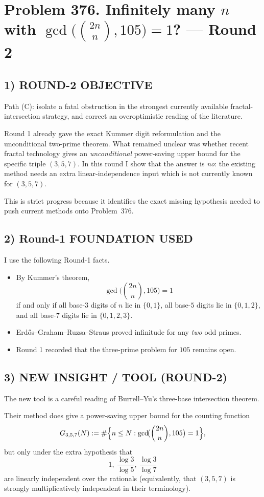 \section*{Problem 376. Infinitely many $n$ with $\gcd\!\bigl(\binom{2n}{n},105\bigr)=1$? --- Round 2}

\subsection*{1) ROUND-2 OBJECTIVE}
Path (C): isolate a fatal obstruction in the strongest currently available fractal-intersection strategy, and correct an overoptimistic reading of the literature.

Round 1 already gave the exact Kummer digit reformulation and the unconditional two-prime theorem.
What remained unclear was whether recent fractal technology gives an \emph{unconditional} power-saving upper bound for the specific triple $(3,5,7)$.
In this round I show that the answer is \emph{no}: the existing method needs an extra linear-independence input which is not currently known for $(3,5,7)$.

This is strict progress because it identifies the exact missing hypothesis needed to push current methods onto Problem~376.

\subsection*{2) Round-1 FOUNDATION USED}
I use the following Round-1 facts.
\begin{itemize}
\item By Kummer's theorem,
\[
\gcd\!\bigl(\binom{2n}{n},105\bigr)=1
\]
if and only if all base-$3$ digits of $n$ lie in $\{0,1\}$, all base-$5$ digits lie in $\{0,1,2\}$, and all base-$7$ digits lie in $\{0,1,2,3\}$.
\item Erd\H{o}s--Graham--Ruzsa--Straus proved infinitude for any \emph{two} odd primes.
\item Round 1 recorded that the three-prime problem for $105$ remains open.
\end{itemize}

\subsection*{3) NEW INSIGHT / TOOL (ROUND-2)}
The new tool is a careful reading of Burrell--Yu's three-base intersection theorem.

Their method does give a power-saving upper bound for the counting function
\[
G_{3,5,7}(N):=\#\Bigl\{n\le N:\gcd\!\bigl(\binom{2n}{n},105\bigr)=1\Bigr\},
\]
but only under the extra hypothesis that
\[
1,\ \frac{\log 3}{\log 5},\ \frac{\log 3}{\log 7}
\]
are linearly independent over the rationals (equivalently, that $(3,5,7)$ is strongly multiplicatively independent in their terminology).

